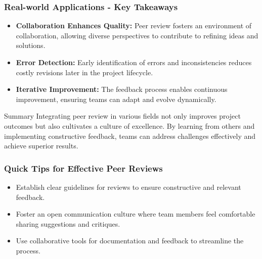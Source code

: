 \documentclass{beamer}
\begin{document}
\begin{frame}[fragile]
    \frametitle{Real-world Applications - Key Takeaways}
    \begin{itemize}
        \item \textbf{Collaboration Enhances Quality:} 
            Peer review fosters an environment of collaboration, allowing diverse perspectives to contribute to refining ideas and solutions.
        \item \textbf{Error Detection:} 
            Early identification of errors and inconsistencies reduces costly revisions later in the project lifecycle.
        \item \textbf{Iterative Improvement:} 
            The feedback process enables continuous improvement, ensuring teams can adapt and evolve dynamically.
    \end{itemize}
    
    \begin{block}{Summary}
        Integrating peer review in various fields not only improves project outcomes but also cultivates a culture of excellence. By learning from others and implementing constructive feedback, teams can address challenges effectively and achieve superior results.
    \end{block}
\end{frame}

\begin{frame}[fragile]
    \frametitle{Quick Tips for Effective Peer Reviews}
    \begin{itemize}
        \item Establish clear guidelines for reviews to ensure constructive and relevant feedback.
        \item Foster an open communication culture where team members feel comfortable sharing suggestions and critiques.
        \item Use collaborative tools for documentation and feedback to streamline the process.
    \end{itemize}
\end{frame}
\end{document}
